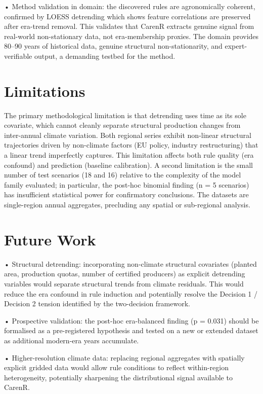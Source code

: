 \noindent •  Method validation in domain: the discovered rules are agronomically coherent, confirmed by LOESS detrending which shows feature correlations are preserved after era-trend removal. This validates that CarenR extracts genuine signal from real-world non-stationary data, not era-membership proxies. The domain provides 80--90 years of historical data, genuine structural non-stationarity, and expert-verifiable output, a demanding testbed for the method.


\section{Limitations}\label{sec:limitations}

The primary methodological limitation is that detrending uses time as its sole covariate, which cannot cleanly separate structural production changes from inter-annual climate variation. Both regional series exhibit non-linear structural trajectories driven by non-climate factors (EU policy, industry restructuring) that a linear trend imperfectly captures. This limitation affects both rule quality (era confound) and prediction (baseline calibration). A second limitation is the small number of test scenarios (18 and 16) relative to the complexity of the model family evaluated; in particular, the post-hoc binomial finding (n = 5 scenarios) has insufficient statistical power for confirmatory conclusions. The datasets are single-region annual aggregates, precluding any spatial or sub-regional analysis.


\section{Future Work}\label{sec:future_work}

\noindent •  Structural detrending: incorporating non-climate structural covariates (planted area, production quotas, number of certified producers) as explicit detrending variables would separate structural trends from climate residuals. This would reduce the era confound in rule induction and potentially resolve the Decision 1 / Decision 2 tension identified by the two-decision framework.

\noindent •  Prospective validation: the post-hoc era-balanced finding (p = 0.031) should be formalised as a pre-registered hypothesis and tested on a new or extended dataset as additional modern-era years accumulate.

\noindent •  Higher-resolution climate data: replacing regional aggregates with spatially explicit gridded data would allow rule conditions to reflect within-region heterogeneity, potentially sharpening the distributional signal available to CarenR.

